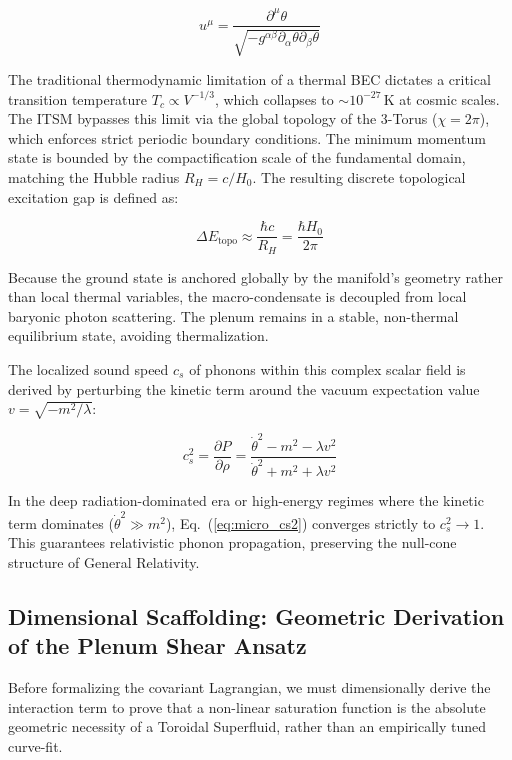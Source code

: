 \documentclass[aps,prd,10pt,twocolumn,superscriptaddress,nofootinbib,floatfix]{revtex4-2}
\begin{document}
\begin{equation}
u^\mu = \frac{\partial^\mu \theta}{\sqrt{-g^{\alpha\beta}\partial_\alpha \theta \partial_\beta \theta}}
\end{equation}

The traditional thermodynamic limitation of a thermal BEC dictates a critical transition temperature $T_c \propto V^{-1/3}$, which collapses to $\sim 10^{-27}\,\text{K}$ at cosmic scales. The ITSM bypasses this limit via the global topology of the 3-Torus ($\chi = 2\pi$), which enforces strict periodic boundary conditions. The minimum momentum state is bounded by the compactification scale of the fundamental domain, matching the Hubble radius $R_H = c/H_0$. The resulting discrete topological excitation gap is defined as:

\begin{equation}
\Delta E_{\text{topo}} \approx \frac{\hbar c}{R_H} = \frac{\hbar H_0}{2\pi}
\end{equation}

Because the ground state is anchored globally by the manifold's geometry rather than local thermal variables, the macro-condensate is decoupled from local baryonic photon scattering. The plenum remains in a stable, non-thermal equilibrium state, avoiding thermalization.

The localized sound speed $c_s$ of phonons within this complex scalar field is derived by perturbing the kinetic term around the vacuum expectation value $v = \sqrt{-m^2/\lambda}$:

\begin{equation}\label{eq:micro_cs2}
c_s^2 = \frac{\partial P}{\partial \rho} = \frac{\dot{\theta}^2 - m^2 - \lambda v^2}{\dot{\theta}^2 + m^2 + \lambda v^2}
\end{equation}

In the deep radiation-dominated era or high-energy regimes where the kinetic term dominates ($\dot{\theta}^2 \gg m^2$), Eq.~(\ref{eq:micro_cs2}) converges strictly to $c_s^2 \to 1$. This guarantees relativistic phonon propagation, preserving the null-cone structure of General Relativity.

\subsection{Dimensional Scaffolding: Geometric Derivation of the Plenum Shear Ansatz}
Before formalizing the covariant Lagrangian, we must dimensionally derive the interaction term to prove that a non-linear saturation function is the absolute geometric necessity of a Toroidal Superfluid, rather than an empirically tuned curve-fit.
\end{document}
